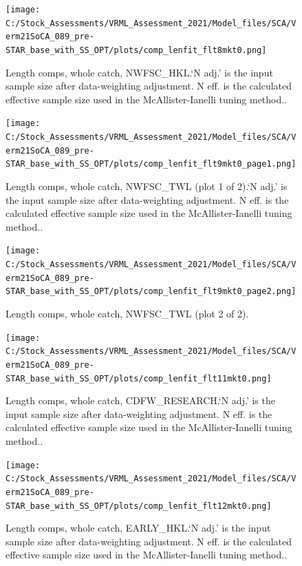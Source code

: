\documentclass[11pt,
  english,
  a4paper,
]{article}
\begin{document}
\begin{figure}
\centering
\texttt{[image: C:/Stock\_Assessments/VRML\_Assessment\_2021/Model\_files/SCA/Verm21SoCA\_089\_pre-STAR\_base\_with\_SS\_OPT/plots/comp\_lenfit\_flt8mkt0.png]}
\caption{Length comps, whole catch, NWFSC\_HKL.`N adj.' is the input sample size after data-weighting adjustment. N eff. is the calculated effective sample size used in the McAllister-Ianelli tuning method..\label{fig:comp_lenfit_flt8mkt0}}
\end{figure}

\begin{figure}
\centering
\texttt{[image: C:/Stock\_Assessments/VRML\_Assessment\_2021/Model\_files/SCA/Verm21SoCA\_089\_pre-STAR\_base\_with\_SS\_OPT/plots/comp\_lenfit\_flt9mkt0\_page1.png]}
\caption{Length comps, whole catch, NWFSC\_TWL (plot 1 of 2).`N adj.' is the input sample size after data-weighting adjustment. N eff. is the calculated effective sample size used in the McAllister-Ianelli tuning method..\label{fig:comp_lenfit_flt9mkt0_page1}}
\end{figure}

\begin{figure}
\centering
\texttt{[image: C:/Stock\_Assessments/VRML\_Assessment\_2021/Model\_files/SCA/Verm21SoCA\_089\_pre-STAR\_base\_with\_SS\_OPT/plots/comp\_lenfit\_flt9mkt0\_page2.png]}
\caption{Length comps, whole catch, NWFSC\_TWL (plot 2 of 2).\label{fig:comp_lenfit_flt9mkt0_page2}}
\end{figure}

\begin{figure}
\centering
\texttt{[image: C:/Stock\_Assessments/VRML\_Assessment\_2021/Model\_files/SCA/Verm21SoCA\_089\_pre-STAR\_base\_with\_SS\_OPT/plots/comp\_lenfit\_flt11mkt0.png]}
\caption{Length comps, whole catch, CDFW\_RESEARCH.`N adj.' is the input sample size after data-weighting adjustment. N eff. is the calculated effective sample size used in the McAllister-Ianelli tuning method..\label{fig:comp_lenfit_flt11mkt0}}
\end{figure}

\begin{figure}
\centering
\texttt{[image: C:/Stock\_Assessments/VRML\_Assessment\_2021/Model\_files/SCA/Verm21SoCA\_089\_pre-STAR\_base\_with\_SS\_OPT/plots/comp\_lenfit\_flt12mkt0.png]}
\caption{Length comps, whole catch, EARLY\_HKL.`N adj.' is the input sample size after data-weighting adjustment. N eff. is the calculated effective sample size used in the McAllister-Ianelli tuning method..\label{fig:comp_lenfit_flt12mkt0}}
\end{figure}
\end{document}
